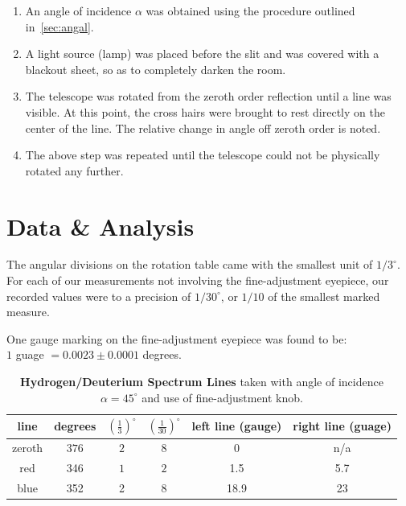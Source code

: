 \documentclass[paper=a4, fontsize=11pt]{scrartcl} %
\numberwithin{equation}{section}
\numberwithin{figure}{section}
\numberwithin{table}{section}
\begin{document}
\begin{enumerate}
\item An angle of incidence $\alpha$ was obtained using the procedure
  outlined in~\ref{sec:angal}.
\item A light source (lamp) was placed before the slit and was covered with a blackout sheet, so as to completely darken the room.
\item The telescope was rotated from the zeroth order reflection until a line was visible. At this point, the cross hairs were brought to rest directly on the center of the line. The relative change in angle off zeroth order is noted.
\item The above step was repeated until the telescope could not be physically rotated any further.
\end{enumerate}




\section{Data \& Analysis}

The angular divisions on the rotation table came with the smallest unit of $1/3^\circ$. For each of our measurements not involving the fine-adjustment eyepiece, our recorded values were to a precision of $1/30^\circ$, or $1/10$ of the smallest marked measure.

One gauge marking on the fine-adjustment eyepiece was found to be: \\
$1$ guage $= 0.0023\pm0.0001$ degrees.

\begin{table}[H]
\centering
\caption{\textbf{Hydrogen/Deuterium Spectrum Lines} taken with angle of incidence $\alpha = 45^\circ$ and use of fine-adjustment knob. }
\begin{tabular}{ || c | c c c c c || }
  \hline
  \hline
  line & degrees & $(\frac{1}{3})^\circ$ & $(\frac{1}{30})^\circ$ & left line (gauge)  & right line (guage) \\
  \hline
  zeroth & $376$ & $2$ & $8$ & $0$ & n/a \\
  red & 346 & $1$ & $2$ & 1.5 & 5.7 \\
  blue & 352 & 2 & 8 & 18.9 & 23 \\
  \hline
  \hline
\end{tabular}
\label{table:hd45}
\end{table}

\vspace{1.5em}
\end{document}
